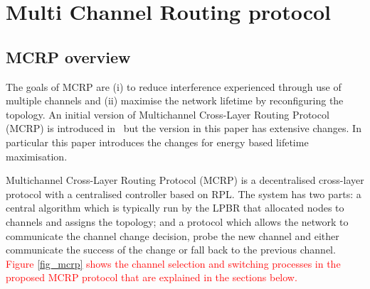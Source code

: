 \section{Multi Channel Routing protocol}
\label{MCRP}

\subsection{MCRP overview}
The goals of MCRP are (i) to reduce interference experienced through use of multiple channels and (ii) maximise the network lifetime by reconfiguring the topology. 
An initial version of Multichannel Cross-Layer Routing Protocol (MCRP) is introduced in~\cite{mcrp} but the version in this paper has extensive changes.  In particular this paper introduces the changes for energy based lifetime maximisation.

Multichannel Cross-Layer Routing Protocol (MCRP) \cite{mcrp} is a decentralised cross-layer protocol with a centralised controller based on RPL.  The system has two parts: a central algorithm which is typically run by the LPBR that allocated nodes to channels and assigns the topology; and a protocol which allows the network to communicate the channel change decision, probe the new channel and either communicate the success of the change or fall back to the previous channel. \textcolor{red}{Figure \ref{fig_mcrp} shows the channel selection and switching processes in the proposed MCRP protocol that are explained in the sections below.}

